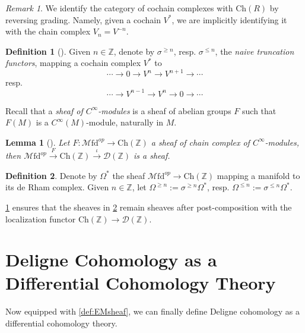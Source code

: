 \documentclass[10pt]{amsart}
\newcommand{\D}{\mathscr{D}}
\newcommand{\bZ}{\mathbb{Z}}
\newcommand{\Ch}{\mathrm{Ch}}
\newcommand{\Mfd}{\mathscr{M}\mathrm{fd}}
\newcommand{\Ab}{\mathscr{A}\mathrm{b}}
\newtheorem{lemma}{Lemma}
\theoremstyle{definition}
\newtheorem{definition}{Definition}
\theoremstyle{remark}
\newtheorem{remark}{Remark}
\begin{document}
\begin{remark}\label{id}
  We identify the category of cochain complexes with $\Ch(R)$ by reversing grading. Namely, given a cochain $V^*$, we are implicitly identifying it with the chain complex $V_n=V^{-n}$. 
\end{remark}
\begin{definition}[{\cite[Definition 7.14]{bunkenikolausvoelkl2016diffcoh}}]Given $n\in\bZ$, denote by $\sigma^{\geq n}$, resp. $\sigma^{\leq n}$, the \emph{naive truncation functors}, mapping a cochain complex $V^*$ to \[\cdots\to0\to V^n\to V^{n+1}\to\cdots\]
  resp. \[\cdots\to V^{n-1}\to V^n\to0\to\cdots\]
\end{definition}
Recall that a \emph{sheaf of $C^\infty$-modules} is a sheaf of abelian groups $F$ such that $F(M)$ is a $C^\infty(M)$-module, naturally in $M$. 
\begin{lemma}[{\cite[Lemma 7.12]{bunkenikolausvoelkl2016diffcoh}}]\label{localization}
  Let $F:\Mfd^{op}\to\Ch(\bZ)$ a sheaf of chain complex of $C^\infty$-modules, then $\Mfd^{op}\xrightarrow{F}\Ch(\bZ)\xrightarrow{\iota}\D(\bZ)$ is a sheaf. 
\end{lemma}
\begin{definition}\label{forms}
  Denote by $\Omega^*$ the sheaf $\Mfd^{op}\to\Ch(\bZ)$ mapping a manifold to its de Rham complex. Given $n\in\bZ$, let $\Omega^{\geq n}:=\sigma^{\geq n}\Omega^*$, resp. $\Omega^{\leq n}:=\sigma^{\leq n}\Omega^*$.
\end{definition}
\cref{localization} ensures that the sheaves in \cref{forms} remain sheaves after post-composition with the localization functor $\Ch(\bZ)\to\D(\bZ)$. 





\section{Deligne Cohomology as a Differential Cohomology Theory}
Now equipped with \cref{def:EMsheaf}, we can finally define Deligne cohomology as a differential cohomology theory.
\end{document}
